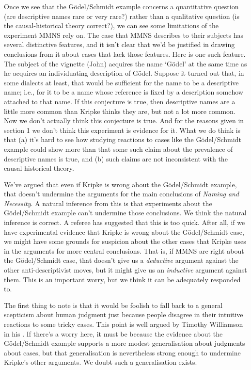 Once we see that the G\"{o}del\-/\-Schmidt example concerns a quantitative question (are descriptive names rare or very rare?) rather than a qualitative question (is the causal-historical theory correct?), we can see some limitations of the experiment MMNS rely on. The case that MMNS describes to their subjects has several distinctive features, and it isn't clear that we'd be justified in drawing conclusions from it about cases that lack those features. Here is one such feature. The subject of the vignette (John) acquires the name `G\"{o}del' at the same time as he acquires an individuating description of G\"{o}del. Suppose it turned out that, in some dialects at least, that would be sufficient for the name to be a descriptive name; i.e., for it to be a name whose reference is fixed by a description somehow attached to that name. If this conjecture is true, then descriptive names are a little more common than Kripke thinks they are, but not a lot more common. Now we don't actually think this conjecture is true. And for the reasons given in section 1 we don't think this experiment is evidence for it. What we do think is that (a) it's hard to see how studying reactions to cases like the G\"{o}del\-/\-Schmidt example could show more than that some such claim about the prevalence of descriptive names is true, and (b) such claims are not inconsistent with the causal-historical theory.

We've argued that even if Kripke is wrong about the G\"{o}del\-/\-Schmidt example, that doesn't undermine the arguments for the main conclusions of \textit{Naming and Necessity}. A natural inference from this is that experiments about the G\"{o}del\-/\-Schmidt example can't undermine those conclusions. We think the natural inference is correct. A referee has suggested that this is too quick. After all, if we have experimental evidence that Kripke is wrong about the G\"{o}del\-/\-Schmidt case, we might have some grounds for suspicion about the other cases that Kripke uses in the arguments for more central conclusions. That is, if MMNS are right about the G\"{o}del\-/\-Schmidt case, that doesn't give us a \textit{deductive} argument against the other anti-descriptivist moves, but it might give us an \textit{inductive} argument against them. This is an important worry, but we think it can be adequately responded to.

The first thing to note is that it would be foolish to fall back to a general scepticism about human judgment just because people disagree in their intuitive reactions to some tricky cases. This point is well argued by Timothy Williamson in his \citeyearpar[Ch. 6]{Williamson2007-WILTPO-17}. If there's a worry here, it must be because the evidence about the G\"{o}del\-/\-Schmidt example supports a more modest generalisation about judgments about cases, but that generalisation is nevertheless strong enough to undermine Kripke's other arguments. We doubt such a generalisation exists.

